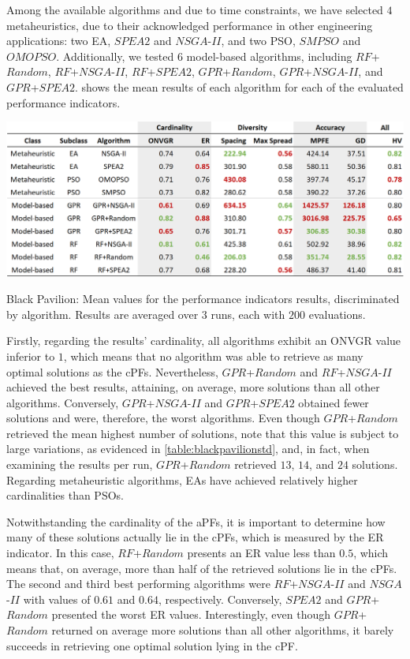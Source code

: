Among the available algorithms and due to time constraints, we have selected $4$ metaheuristics, due to their acknowledged performance in other engineering applications: two \ac{EA}, $SPEA2$ and $NSGA$-$II$, and two \ac{PSO}, $SMPSO$ and $OMOPSO$. Additionally, we tested $6$ model-based algorithms, including $RF$+$Random$, $RF$+$NSGA$-$II$, $RF$+$SPEA2$, $GPR$+$Random$, $GPR$+$NSGA$-$II$, and $GPR$+$SPEA2$.  shows the mean results of each algorithm for each of the evaluated performance indicators. 

\begin{table}[]
	\centering
	\includegraphics[width=\textwidth]{Images/Evaluation/BlackPavilion/Results_Mean_20190428.PNG}
	\caption[Black Pavilion: Mean values for the performance indicators results, discriminated by algorithm]{Black Pavilion: Mean values for the performance indicators results, discriminated by algorithm. Results are averaged over $3$ runs, each with $200$ evaluations.}
	\label{table:blackpavilion}
\end{table}

Firstly, regarding the results' cardinality, all algorithms exhibit an \ac{ONVGR} value inferior to $1$, which means that no algorithm was able to retrieve as many optimal solutions as the \acp{cPF}. Nevertheless, $GPR$+$Random$ and $RF$+$NSGA$-$II$ achieved the best results, attaining, on average, more solutions than all other algorithms. Conversely, $GPR$+$NSGA$-$II$ and $GPR$+$SPEA2$ obtained fewer solutions and were, therefore, the worst algorithms. Even though $GPR$+$Random$ retrieved the mean highest number of solutions, note that this value is subject to large variations, as evidenced in \cref{table:blackpavilionstd}, and, in fact, when examining the results per run, $GPR$+$Random$ retrieved $13$, $14$, and $24$ solutions. Regarding metaheuristic algorithms, \acp{EA} have achieved relatively higher cardinalities than \acp{PSO}. 

Notwithstanding the cardinality of the \acp{aPF}, it is important to determine how many of these solutions actually lie in the \acp{cPF}, which is measured by the \ac{ER} indicator. In this case, $RF$+$Random$ presents an \ac{ER} value less than $0.5$, which means that, on average, more than half of the retrieved solutions lie in the \acp{cPF}. The second and third best performing algorithms were $RF$+$NSGA$-$II$ and $NSGA$-$II$ with values of $0.61$ and $0.64$, respectively. Conversely, $SPEA2$ and $GPR$+$Random$ presented the worst \ac{ER} values. Interestingly, even though $GPR$+$Random$ returned on average more solutions than all other algorithms, it barely succeeds in retrieving one optimal solution lying in the \ac{cPF}.

